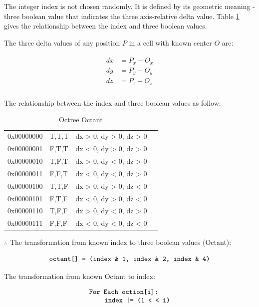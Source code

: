 The integer index is not chosen randomly. It is defined by its geometric meaning - three boolean value that indicates the three axis-relative delta value. Table \ref{tab:octree-octant} gives the relationship between the index and three boolean values.

The three delta values of any position $P$ in a cell with known center $O$ are:

\[
\begin{array}{lr}
\begin{aligned}
dx &= P_x - O_x\\
dy &= P_y - O_y\\
dz &= P_z - O_z\\
\end{aligned}
\end{array}
\]

The relationship between the index and three boolean values as follow:

\begin{table}[H]
\caption{Octree Octant}
\label{tab:octree-octant}
\centering
	\begin{tabular}{l l l l}
	\toprule
	\tabhead{Binary Index} & \tabhead{Octant} & \tabhead{Geometric Meaning}\\
	\midrule
	0x00000000 & T,\;T,\;T & dx > 0, dy > 0, dz > 0\\
	0x00000001 & F,\;T,\;T & dx < 0, dy > 0, dz > 0\\
	0x00000010 & T,\;F,\;T & dx > 0, dy < 0, dz > 0\\
	0x00000011 & F,\;F,\;T & dx < 0, dy < 0, dz > 0\\
	0x00000100 & T,\;T,\;F & dx > 0, dy > 0, dz < 0\\
	0x00000101 & F,\;T,\;F & dx < 0, dy > 0, dz < 0\\
	0x00000110 & T,\;F,\;F & dx > 0, dy < 0, dz > 0\\
	0x00000111 & F,\;F,\;F & dx < 0, dy < 0, dz < 0\\
	\bottomrule
	\end{tabular}
\end{table}

$\therefore$ The transformation from known index to three boolean values (Octant):

\[
\texttt{octant[] = (index \& 1, index \& 2, index \& 4)}
\]

The transformation from known Octant to index:

\[
\begin{array}{lr}
\texttt{For Each oction[i]:}\\
\;\;\;\;\;\;\;\;\texttt{index |= (1 < < i)}\\
\end{array}
\]


